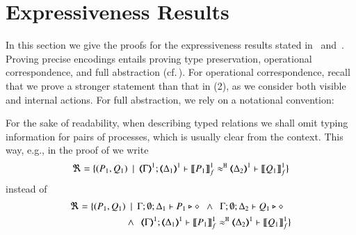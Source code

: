 \section{Expressiveness Results}
\label{app:proofs}

\noi
In this section we give the proofs for the expressiveness
results stated in~ and~.
Proving precise encodings entails proving type preservation, operational correspondence, and 
full abstraction (cf.\,). For operational correspondence, 
recall that we prove a stronger statement than that in (2),
		as we %
		consider both visible and internal actions.
For full abstraction, we rely on a notational convention:

\begin{notation}
For the sake of readability, when describing typed relations we shall omit typing information for pairs of processes, which is usually clear from the context. This way, e.g., in the proof of
  we write
	\[
		\Re = \set{(P_1, Q_1) \setbar \horel{\mapt{\Gamma}^{1}}{\mapt{\Delta_1}^{1}}{\pmapp{P_1}{1}{f}}{\hwb}{\mapt{\Delta_2}^{1}}{\pmapp{Q_1}{1}{f}}}
	\]
	instead of 
		\begin{align*}
		\Re = \set{(P_1, Q_1) & \setbar 
		\Gamma; \emptyset; \Delta_1 \proves P_1 \hastype \Proc
		~~\land~~ 
		\Gamma; \emptyset; \Delta_2 \proves Q_1 \hastype \Proc
		 \\ & \land~~
		\horel{\mapt{\Gamma}^{1}}{\mapt{\Delta_1}^{1}}{\pmapp{P_1}{1}{f}}{\hwb}{\mapt{\Delta_2}^{1}}{\pmapp{Q_1}{1}{f}}}
	\end{align*}
	\end{notation}


